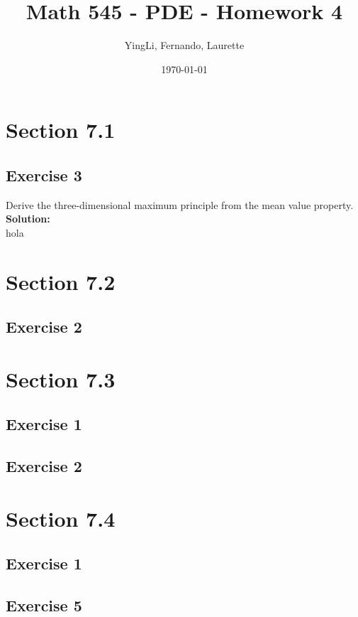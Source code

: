 \documentclass[12pt]{article}%
\begin{document}
\title{Math 545 - PDE - Homework 4}
\author{YingLi, Fernando, Laurette }
\date{\today}
\maketitle

\section*{Section 7.1}
\subsection*{Exercise 3}
Derive the three-dimensional maximum principle from the mean value property.\\
\textbf{Solution:}\\
hola
\section*{Section 7.2}
\subsection*{Exercise 2}
\section*{Section 7.3}
\subsection*{Exercise 1}
\subsection*{Exercise 2}
\section*{Section 7.4}
\subsection*{Exercise 1}
\subsection*{Exercise 5}
\end{document}
